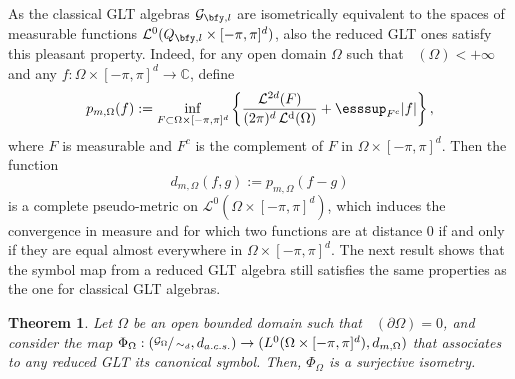 \documentclass{amsart}
\newtheorem{thm}{Theorem}[section]
\DeclareMathOperator{\Ld}{\mathcal{L}^d}
\begin{document}
As the classical GLT algebras $\mathcal{G}_{\bfy,l}$ are isometrically equivalent to the spaces of measurable functions $\mathcal{L}^0(Q_{\bfy,l}\times[-\pi,\pi]^d)$, also the reduced GLT ones satisfy this pleasant property.
Indeed, for any open domain $\Omega$ such that $\Ld(\Omega)<+\infty$ and any $f:\Omega\times[-\pi,\pi]^d\to\mathbb{C}$, define
\begin{equation*}
    p_{m,\Omega}(f):=\inf\limits_{F\subset \Omega\times[-\pi,\pi]^d}\left\{\frac{\mathcal{L}^{2d}(F)}{(2\pi)^d\Ld(\Omega)}+\esssup_{F^c}|f|\right\},
\end{equation*}
where $F$ is measurable and $F^c$ is the complement of $F$ in $\Omega\times[-\pi,\pi]^d$. Then the function
\begin{equation*}
    d_{m,\Omega}(f,g):=p_{m,\Omega}(f-g)
\end{equation*}
is a complete pseudo-metric on $\mathcal{L}^0(\Omega\times[-\pi,\pi]^d)$, which induces the convergence in measure and for which two functions are at distance $0$ if and only if they are equal almost everywhere in $\Omega\times[-\pi,\pi]^d$. The next result shows that the symbol map from a reduced GLT algebra still satisfies the same properties as the one for classical GLT algebras. 

\begin{thm}\label{isometry_red_GLT}
 Let $\Omega$ be an open bounded domain such that $\Ld(\partial\Omega)=0$, and consider the map $\Phi_\Omega:(\sfrac{\mathcal{G}_\Omega}{\sim_d},d_{a.c.s.})\to(L^0(\Omega\times[-\pi,\pi]^d),d_{m,\Omega})$ that associates to any reduced GLT its canonical symbol. Then, $\Phi_\Omega$ is a surjective isometry.   
\end{thm}
\end{document}

